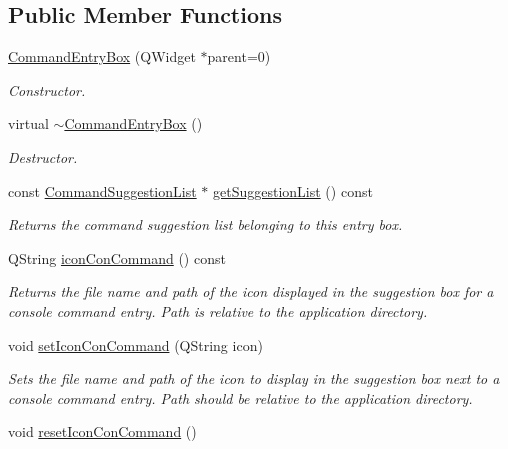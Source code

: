 \subsection*{Public Member Functions}
\begin{DoxyCompactItemize}
\item 
\hyperlink{class_command_entry_box_a75c9cb2fee4e0034bc114222fa890e3b}{Command\-Entry\-Box} (Q\-Widget $\ast$parent=0)
\begin{DoxyCompactList}\small\item\em Constructor. \end{DoxyCompactList}\item 
\hypertarget{class_command_entry_box_a66f323c649a34cc167f124069aa5de53}{virtual \hyperlink{class_command_entry_box_a66f323c649a34cc167f124069aa5de53}{$\sim$\-Command\-Entry\-Box} ()}\label{class_command_entry_box_a66f323c649a34cc167f124069aa5de53}

\begin{DoxyCompactList}\small\item\em Destructor. \end{DoxyCompactList}\item 
const \hyperlink{class_command_suggestion_list}{Command\-Suggestion\-List} $\ast$ \hyperlink{class_command_entry_box_ae00fdd5b4cbf8fc825e5333f3ae47dad}{get\-Suggestion\-List} () const 
\begin{DoxyCompactList}\small\item\em Returns the command suggestion list belonging to this entry box. \end{DoxyCompactList}\item 
Q\-String \hyperlink{class_command_entry_box_a4ff50a0239789c705b15a395cd1d3a68}{icon\-Con\-Command} () const 
\begin{DoxyCompactList}\small\item\em Returns the file name and path of the icon displayed in the suggestion box for a console command entry. Path is relative to the application directory. \end{DoxyCompactList}\item 
void \hyperlink{class_command_entry_box_a5fc40503d8f9b6bf8faddc42ff6663bb}{set\-Icon\-Con\-Command} (Q\-String icon)
\begin{DoxyCompactList}\small\item\em Sets the file name and path of the icon to display in the suggestion box next to a console command entry. Path should be relative to the application directory. \end{DoxyCompactList}\item 
\hypertarget{class_command_entry_box_a9807265bf78369d6dfbc8210aa39c562}{void \hyperlink{class_command_entry_box_a9807265bf78369d6dfbc8210aa39c562}{reset\-Icon\-Con\-Command} ()}\label{class_command_entry_box_a9807265bf78369d6dfbc8210aa39c562}


\end{DoxyCompactItemize}
